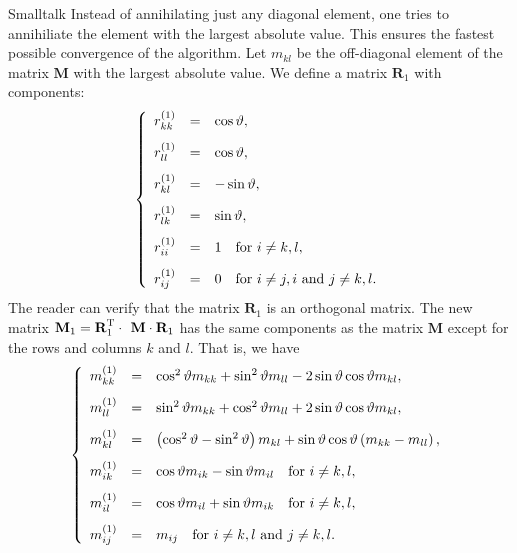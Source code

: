 \begin{displaycode}{Smalltalk}
Instead of annihilating just any diagonal element, one tries to
annihiliate the element with the largest absolute value. This
ensures the fastest possible convergence of the algorithm. Let
$m_{kl}$ be the off-diagonal element of the matrix $\textbf{M}$ with
the largest absolute value. We define a matrix $\textbf{R}_1$ with
components:
\begin{equation}
  \left\{
  \begin{array}{lcl}
    r^{\left(1\right)}_{kk} &=& \cos\vartheta, \\*[2ex]
    r^{\left(1\right)}_{ll} &=& \cos\vartheta, \\*[2ex]
    r^{\left(1\right)}_{kl} &=& -\sin\vartheta, \\*[2ex]
    r^{\left(1\right)}_{lk} &=& \sin\vartheta, \\*[2ex]
    r^{\left(1\right)}_{ii} &=& 1\mbox{\quad for $i\ne k,l$}, \\*[2ex]
    r^{\left(1\right)}_{ij} &=& 0\mbox{\quad for $i\ne j, i$ and $j \ne k,l$.}
  \end{array}
  \right.
\end{equation}
The reader can verify that the matrix $\textbf{R}_1$ is an orthogonal
matrix. The new matrix $\textbf{M}_1=\textbf{R}^{\mathop\textrm{T}}_1\cdot\textbf{
M}\cdot\textbf{R}_1$ has the same components as the matrix $\textbf{M}$
except for the rows and columns $k$ and $l$. That is, we have
\begin{equation}
\label{eq:jacobistep}
  \left\{
  \begin{array}{lcl}
    m^{\left(1\right)}_{kk} &=& \cos^2\vartheta m_{kk}+\sin^2\vartheta m_{ll} - 2\sin\vartheta\cos\vartheta m_{kl}, \\*[2ex]
    m^{\left(1\right)}_{ll} &=& \sin^2\vartheta m_{kk}+\cos^2\vartheta m_{ll} + 2\sin\vartheta\cos\vartheta m_{kl}, \\*[2ex]
    m^{\left(1\right)}_{kl} &=& \left(\cos^2\vartheta-\sin^2\vartheta\right)m_{kl}+\sin\vartheta\cos\vartheta
    \left(m_{kk}-m_{ll}\right), \\*[2ex]
    m^{\left(1\right)}_{ik} &=& \cos\vartheta m_{ik}-\sin\vartheta m_{il}\mbox{\quad for $i\ne k,l$}, \\*[2ex]
    m^{\left(1\right)}_{il} &=& \cos\vartheta m_{il}+\sin\vartheta m_{ik}\mbox{\quad for $i\ne k,l$}, \\*[2ex]
    m^{\left(1\right)}_{ij} &=& m_{ij}\mbox{\quad for $i\ne k,l$ and $j\ne k,l$}.  \end{array}
  \right.
\end{equation}

\end{displaycode}
